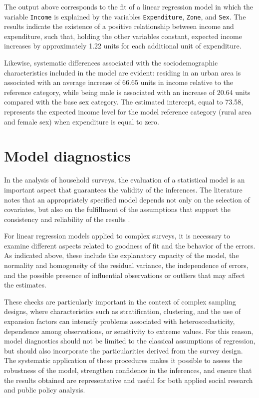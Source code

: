 \documentclass[
  english,
  12pt,
]{book}
\begin{document}
The output above corresponds to the fit of a linear regression model in which the variable \texttt{Income} is explained by the variables \texttt{Expenditure}, \texttt{Zone}, and \texttt{Sex}. The results indicate the existence of a positive relationship between income and expenditure, such that, holding the other variables constant, expected income increases by approximately 1.22 units for each additional unit of expenditure.

Likewise, systematic differences associated with the sociodemographic characteristics included in the model are evident: residing in an urban area is associated with an average increase of 66.65 units in income relative to the reference category, while being male is associated with an increase of 20.64 units compared with the base sex category. The estimated intercept, equal to 73.58, represents the expected income level for the model reference category (rural area and female sex) when expenditure is equal to zero.

\section{Model diagnostics}\label{diagnostico-del-modelo}

In the analysis of household surveys, the evaluation of a statistical model is an important aspect that guarantees the validity of the inferences. The literature notes that an appropriately specified model depends not only on the selection of covariates, but also on the fulfillment of the assumptions that support the consistency and reliability of the results \citep{tellez2015estadistica}.

For linear regression models applied to complex surveys, it is necessary to examine different aspects related to goodness of fit and the behavior of the errors. As indicated above, these include the explanatory capacity of the model, the normality and homogeneity of the residual variance, the independence of errors, and the possible presence of influential observations or outliers that may affect the estimates.

These checks are particularly important in the context of complex sampling designs, where characteristics such as stratification, clustering, and the use of expansion factors can intensify problems associated with heteroscedasticity, dependence among observations, or sensitivity to extreme values. For this reason, model diagnostics should not be limited to the classical assumptions of regression, but should also incorporate the particularities derived from the survey design. The systematic application of these procedures makes it possible to assess the robustness of the model, strengthen confidence in the inferences, and ensure that the results obtained are representative and useful for both applied social research and public policy analysis.
\end{document}

